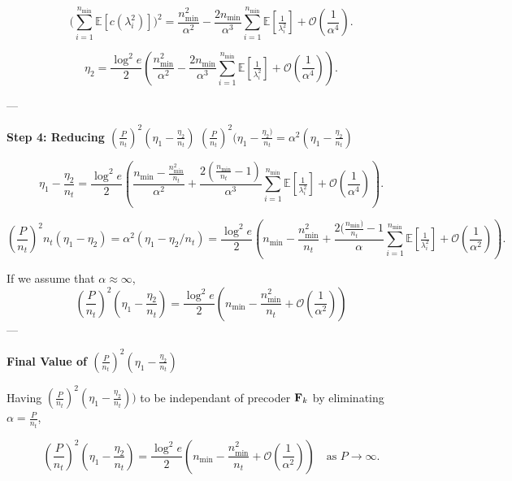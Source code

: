 \documentclass[a4paper, 12pt, onecolumn, journal, twoside, draftclsnofoot]{IEEEtran}
\begin{document}
\begin{equation*}
\Bigg(\sum_{i=1}^{n_{\min}}\mathbb{E}[c(\lambda_i^2)]\Bigg)^2
= \frac{n_{\min}^2}{\alpha^2} 
- \frac{2n_{\min}}{\alpha^3}\sum_{i=1}^{n_{\min}}\mathbb{E}\!\left[\tfrac{1}{\lambda_i^2}\right]
+ \mathcal{O}\!\left(\frac{1}{\alpha^4}\right).
\end{equation*}

\begin{equation*}
\eta_2 = \frac{\log^2 e}{2}\left(
\frac{n_{\min}^2}{\alpha^2} 
- \frac{2n_{\min}}{\alpha^3}\sum_{i=1}^{n_{\min}}\mathbb{E}\!\left[\tfrac{1}{\lambda_i^2}\right]
+ \mathcal{O}\!\left(\frac{1}{\alpha^4}\right)\right).
\end{equation*}

---

\textbf{Step 4: Reducing $(\frac{P}{n_t})^2 (\eta_1 - \frac{\eta_2}{n_t})$ }
$(\frac{P}{n_t})^2 (\eta_1 - \frac{\eta_2)}{n_t} = \alpha^2 (\eta_1 - \frac{\eta_2}{n_t})$

\begin{equation*}
\eta_1 -\frac{\eta_2}{n_t}= \frac{\log^2 e}{2}\left(
\frac{n_{\min}- \frac{n_{\min}^2}{n_t}}{\alpha^2}
+ \frac{2( \frac{n_{\min}} {n_t} -1)}{\alpha^3}\sum_{i=1}^{n_{\min}}\mathbb{E}\!\left[\tfrac{1}{\lambda_i^2}\right]
+ \mathcal{O}\!\left(\frac{1}{\alpha^4}\right)\right).
\end{equation*}

\begin{equation*}
(\frac{P}{n_t})^2 {n_t}(\eta_1-\eta_2) = \alpha^2(\eta_1-\eta_2/n_t)
= \frac{\log^2 e}{2}\left(
n_{\min}- \frac{n_{\min}^2}{n_t}
+ \frac{ 2( \frac{ n_{\min})} {n_t} -1 } {\alpha}\sum_{i=1}^{n_{\min}}\mathbb{E}\!\left[\tfrac{1}{\lambda_i^2}\right]
+ \mathcal{O}\!\left(\frac{1}{\alpha^2}\right)\right).
\end{equation*}

If we assume that $\alpha \approx \infty$,
\begin{equation*}
 (\frac{P}{n_t})^2(\eta_1- \frac{\eta_2}{n_t})  = \frac{\log^2 e}{2}\left(
n_{\min}-\frac{n_{\min}^2}{n_t}
+ \mathcal{O}\!\left(\frac{1}{\alpha^2}\right)\right)
\end{equation*}
---


\textbf{ Final Value of $ (\frac{P}{n_t})^2 (\eta_1-\frac{\eta_2}{n_t})$}

Having $(\frac{P}{n_t})^2 (\eta_1-\frac{\eta_2}{n_t}))$ to be independant of precoder ${\bf F}_k$ by eliminating  $\alpha = \frac{P}{n_t}$, 

\begin{equation*}
 (\frac{P}{n_t})^2 (\eta_1-\frac{\eta_2}{n_t})  = \frac{\log^2 e}{2}\left(
n_{\min}-\frac{ n_{\min}^2 } {n_t}
+ \mathcal{O}\!\left(\frac{1}{\alpha^2}\right)\right)
\quad \text{as } P \to \infty.
\end{equation*}
\end{document}
